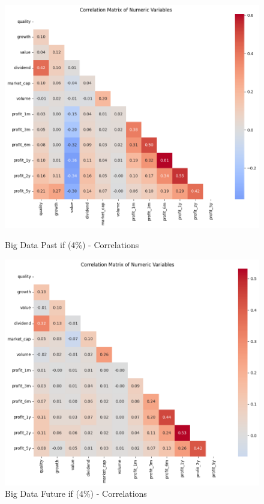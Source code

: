 \documentclass[11pt,english,a4paper,hidelinks]{book}
\begin{document}
\begin{figure}[H]
    \centering
    \begin{minipage}{0.48\textwidth}
        \centering
        \includegraphics[width=\linewidth]{images/code/descriptive analysis/correlations/Big Data Past - IF.png}
        \caption{Big Data Past \acrshort{if} (4\%) - Correlations}
        \label{fig:big_data_past_if_correlations}
    \end{minipage}\hfill
    \begin{minipage}{0.48\textwidth}
        \centering
        \includegraphics[width=\linewidth]{images/code/descriptive analysis/correlations/Big Data future - IF.png}
        \caption{Big Data Future \acrshort{if} (4\%) - Correlations}
        \label{fig:big_data_future_if_correlations}
    \end{minipage}
\end{figure}
\end{document}
